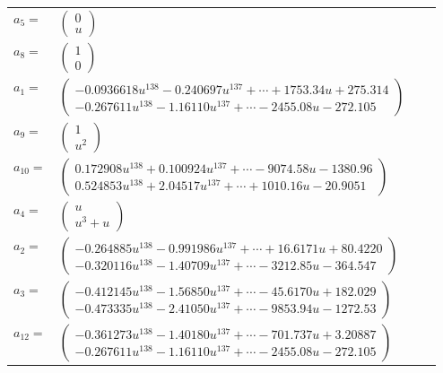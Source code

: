 \documentclass[1p]{elsarticle_modified}
\theoremstyle{definition}
\begin{document}
\begin{tabular}{m{7pt} m{180pt} m{7pt} m{180pt} }
\flushright $a_{5}=$&$\begin{pmatrix}0\\u\end{pmatrix}$ \\
\flushright $a_{8}=$&$\begin{pmatrix}1\\0\end{pmatrix}$ \\
\flushright $a_{1}=$&$\begin{pmatrix}-0.0936618 u^{138}-0.240697 u^{137}+\cdots+1753.34 u+275.314\\-0.267611 u^{138}-1.16110 u^{137}+\cdots-2455.08 u-272.105\end{pmatrix}$ \\
\flushright $a_{9}=$&$\begin{pmatrix}1\\u^2\end{pmatrix}$ \\
\flushright $a_{10}=$&$\begin{pmatrix}0.172908 u^{138}+0.100924 u^{137}+\cdots-9074.58 u-1380.96\\0.524853 u^{138}+2.04517 u^{137}+\cdots+1010.16 u-20.9051\end{pmatrix}$ \\
\flushright $a_{4}=$&$\begin{pmatrix}u\\u^3+u\end{pmatrix}$ \\
\flushright $a_{2}=$&$\begin{pmatrix}-0.264885 u^{138}-0.991986 u^{137}+\cdots+16.6171 u+80.4220\\-0.320116 u^{138}-1.40709 u^{137}+\cdots-3212.85 u-364.547\end{pmatrix}$ \\
\flushright $a_{3}=$&$\begin{pmatrix}-0.412145 u^{138}-1.56850 u^{137}+\cdots-45.6170 u+182.029\\-0.473335 u^{138}-2.41050 u^{137}+\cdots-9853.94 u-1272.53\end{pmatrix}$ \\
\flushright $a_{12}=$&$\begin{pmatrix}-0.361273 u^{138}-1.40180 u^{137}+\cdots-701.737 u+3.20887\\-0.267611 u^{138}-1.16110 u^{137}+\cdots-2455.08 u-272.105\end{pmatrix}$ \\

\end{tabular}
\end{document}
